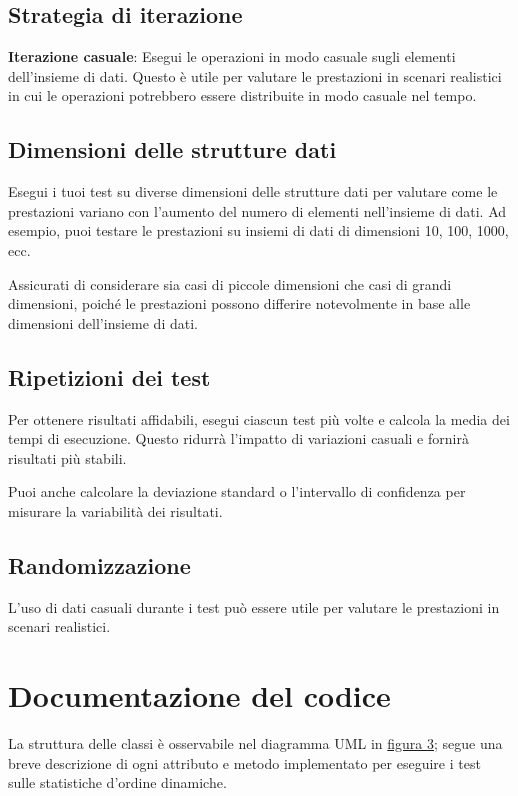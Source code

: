\documentclass[onecolumn]{article}
\begin{document}
\subsection{Strategia di iterazione}

\textbf{Iterazione casuale}: Esegui le operazioni in modo casuale sugli elementi dell'insieme di dati. Questo è utile per valutare le prestazioni in scenari realistici in cui le operazioni potrebbero essere distribuite in modo casuale nel tempo.

\subsection{Dimensioni delle strutture dati}

Esegui i tuoi test su diverse dimensioni delle strutture dati per valutare come le prestazioni variano con l'aumento del numero di elementi nell'insieme di dati. Ad esempio, puoi testare le prestazioni su insiemi di dati di dimensioni 10, 100, 1000, ecc.

Assicurati di considerare sia casi di piccole dimensioni che casi di grandi dimensioni, poiché le prestazioni possono differire notevolmente in base alle dimensioni dell'insieme di dati.

\subsection{Ripetizioni dei test}

Per ottenere risultati affidabili, esegui ciascun test più volte e calcola la media dei tempi di esecuzione. Questo ridurrà l'impatto di variazioni casuali e fornirà risultati più stabili.

Puoi anche calcolare la deviazione standard o l'intervallo di confidenza per misurare la variabilità dei risultati.

\subsection{Randomizzazione}

L'uso di dati casuali durante i test può essere utile per valutare le prestazioni in scenari realistici.

\newpage
\section{Documentazione del codice}

La struttura delle classi è osservabile nel diagramma UML in \hyperref[fig:classi]{figura 3}; segue una breve descrizione di ogni attributo e metodo implementato per eseguire i test sulle statistiche d'ordine dinamiche. 
\end{document}
